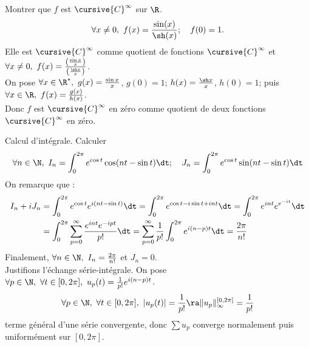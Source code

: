 \documentclass[11pt]{article}
\begin{document}
\vspace*{-0.8cm}

\begin{ex}{}{}
    Montrer que $f$ est $\cursive{C}^\infty$ sur $\R$.
    \begin{equation*}
        \forall x \neq 0, ~ f(x)=\frac{\sin(x)}{\sh(x)}; \quad f(0)=1.
    \end{equation*}
    \tcblower
    Elle est $\cursive{C}^\infty$ comme quotient de fonctions $\cursive{C}^\infty$ et $\forall x \neq 0, ~ f(x) = \frac{\left( \frac{\sin x}{x} \right)}{\left( \frac{\sh x}{x} \right)}$.\\
    On pose $\forall x \in \R^*, ~ g(x)=\frac{\sin x}{x}$, $g(0)=1$; $h(x)=\frac{\sh x}{x}$, $h(0)=1$; puis $\forall x \in \R, ~ f(x)=\frac{g(x)}{h(x)}$.\\
    Donc $f$ est $\cursive{C}^\infty$ en zéro comme quotient de deux fonctions $\cursive{C}^\infty$ en zéro.
\end{ex}

\vspace*{-0.3cm}

\begin{ex}{Calcul d'intégrale.}{}
    Calculer
    \begin{equation*}
        \forall n \in \N, ~ I_n = \int_0^{2\pi}e^{\cos t}\cos(nt-\sin t)\dt; \quad J_n = \int_0^{2\pi}e^{\cos t}\sin(nt-\sin t)\dt
    \end{equation*}
    \tcblower
    On remarque que :
    \begin{align*}
        I_n + iJ_n &= \int_0^{2\pi}e^{\cos t}e^{i(nt - \sin t)}\dt = \int_0^{2\pi} e^{\cos t - i\sin t + int} \dt = \int_0^{2\pi}e^{int}e^{e^{-it}}\dt\\
        &=\int_0^{2\pi}\sum_{p=0}^\infty \frac{e^{int}e^{-ipt}}{p!}\dt = \sum_{p=0}^\infty\frac{1}{p!}\int_0^{2\pi} e^{i(n-p)t}\dt=\frac{2\pi}{n!}
    \end{align*}
    Finalement, $\forall n \in \N, ~ I_n=\frac{2\pi}{n!}$ et $J_n=0$.\\
    Justifions l'échange série-intégrale. On pose $\forall p \in \N, ~ \forall t \in [0,2\pi], ~ u_p(t)=\frac{1}{p!}e^{i(n-p)t}$.
    \begin{equation*}
        \forall p\in\N, ~ \forall t \in [0,2\pi], ~ |u_p(t)|=\frac{1}{p!} \ra \|u_p\|_\infty^{[0,2\pi]}=\frac{1}{p!}
    \end{equation*}
    terme général d'une série convergente, donc $\sum u_p$ converge normalement puis uniformément sur $[0,2\pi]$.
\end{ex}
\end{document}
